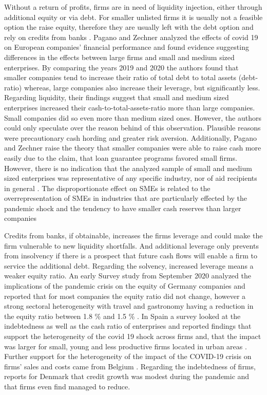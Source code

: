 Without a return of profits, firms are in need of liquidity injection, either through additional equity or via debt. For smaller unlisted firms it is usually not a feasible option the raise equity, therefore they are usually left with the debt option and rely on credits from banks \parencite{pagano_covid-19_2022}. Pagano and Zechner \parencite*{pagano_covid-19_2022} analyzed the effects of covid 19 on European companies’ financial performance and found evidence suggesting differences in the effects between large firms and small and medium sized enterprises. By comparing the years 2019 and 2020 the authors found that smaller companies tend to increase their ratio of total debt to total assets (debt-ratio) whereas, large companies also increase their leverage, but significantly less. Regarding liquidity, their findings suggest that small and medium sized enterprises increased their cash-to-total-assets-ratio more than large companies. Small companies did so even more than medium sized ones. However, the authors could only speculate over the reason behind of this observation. Plausible reasons were precautionary cash hording and greater risk aversion. Additionally, Pagano and Zechner raise the theory that smaller companies were able to raise cash more easily due to the claim, that loan guarantee programs favored small firms. However, there is no indication that the analyzed sample of small and medium sized enterprises was representative of any specific industry, nor of aid recipients in general \parencite{oced_one_2021}. 
The disproportionate effect on SMEs is related to the overrepresentation of SMEs in industries that are particularly effected by the pandemic shock and the tendency to have smaller cash reserves than larger companies 


Credits from banks, if obtainable, increases the firms leverage and could make the firm vulnerable to new liquidity shortfalls. And additional leverage only prevents from insolvency if there is a prospect that future cash flows will enable a firm to service the additional debt. Regarding the solvency, increased leverage means a weaker equity ratio. An early Survey study from September 2020 analyzed the implications of the pandemic crisis on the equity of Germany companies and reported that for most companies the equity ratio did not change, however a strong sectoral heterogeneity with travel and gastronomy having a reduction in the equity ratio between 1.8 \% and 1.5 \% \parencite{peichl_eigenkapitalentwicklung_2021}. In Spain a survey looked at the indebtedness as well as the cash ratio of enterprises and reported findings that support the heterogeneity of the covid 19 shock across firms and, that the impact was larger for small, young and less productive firms located in urban areas \parencite{fernandez-cerezo_firm-level_2021}. Further support for the heterogeneity of the impact of the COVID-19 crisis on firms’ sales and costs came from Belgium \parencite{dhyne_belgian_2021}. Regarding the indebtedness of firms, \parencite{julin_firm_2021} reports for Denmark that credit growth was modest during the pandemic and that firms even find managed to reduce.


